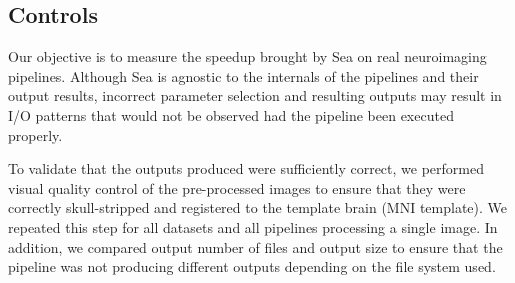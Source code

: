     \begin{table}[t]
      \small\centering
      \caption{Pipeline execution characteristics}\label{table:pipelines}
    \end{table}
    \subsection{Controls}
    Our objective is to measure the speedup brought by Sea on real neuroimaging pipelines.
    Although Sea is agnostic to the internals of the pipelines and their output results, incorrect parameter
    selection and resulting outputs may result in I/O patterns that would not be observed had the
    pipeline been executed properly.
    
    
    To validate that the outputs produced were sufficiently correct, we
    performed visual quality control of the pre-processed images to ensure
    that they were correctly skull-stripped and registered to the template
    brain (MNI template). We repeated this step for all datasets and all
    pipelines processing a single image. In addition, we compared output
    number of files and output size to ensure that the pipeline was not
    producing different outputs depending on the file system used.
    
